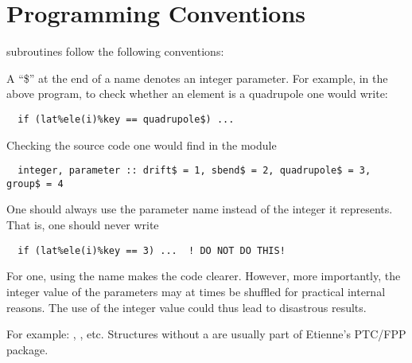 \section{Programming Conventions}

\bmad subroutines follow the following conventions:

\begin{description}

\item[\$ Denotes Parameter:] A ``\$'' at the end of a name denotes an 
integer parameter. For example, in the above program, to check
whether an element is a quadrupole one would write:
\begin{verbatim}
  if (lat%ele(i)%key == quadrupole$) ...
\end{verbatim}
Checking the source code one would find in the module 
\begin{verbatim}
  integer, parameter :: drift$ = 1, sbend$ = 2, quadrupole$ = 3, group$ = 4
\end{verbatim}
One should always use the parameter name instead of the integer it represents.
That is, one should never write
\begin{verbatim}
  if (lat%ele(i)%key == 3) ...  ! DO NOT DO THIS!
\end{verbatim}
For one, using the name makes the code clearer. However, more
importantly, the integer value of the parameters may at times be
shuffled for practical internal reasons. The use of the integer value
could thus lead to disastrous results.  

\item[Structure names have a _struct suffix:]
For example: , , etc. Structures without a 
 are usually part of Etienne's PTC/FPP package.

\end{description}